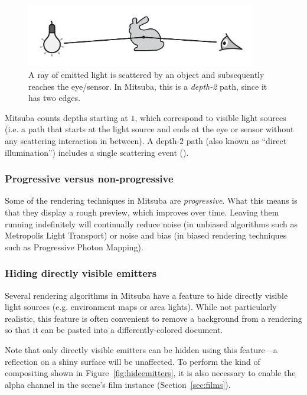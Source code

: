 \begin{figure}[h!]
\centering
\vspace{-5mm}
\includegraphics[width=10cm]{images/path_explanation.pdf}
\vspace{-5mm}
\caption{
    \label{fig:path-explanation}
    A ray of emitted light is scattered by an object and subsequently
    reaches the eye/sensor.
    In Mitsuba, this is a \emph{depth-2} path, since it has two edges.
}
\end{figure}
Mitsuba counts depths starting at $1$, which correspond to
visible light sources (i.e. a path that starts at the light
source and ends at the eye or sensor without any scattering
interaction in between).
A depth-$2$ path (also known as ``direct illumination'') includes
a single scattering event ().

\subsubsection*{Progressive versus non-progressive}
Some of the rendering techniques in Mitsuba are \emph{progressive}.
What this means is that they display a rough preview, which improves over time.
Leaving them running indefinitely will continually reduce noise (in unbiased algorithms
such as Metropolis Light Transport) or noise and bias (in biased
rendering techniques such as Progressive Photon Mapping).
\newpage
\subsubsection*{Hiding directly visible emitters}
\label{sec:hideemitters}
Several rendering algorithms in Mitsuba have a feature to hide directly
visible light sources (e.g. environment maps or area lights). While not
particularly realistic, this feature is often convenient to remove a background
from a rendering so that it can be pasted into a differently-colored document.

Note that only directly visible emitters can be hidden using this feature---a
reflection on a shiny surface will be unaffected. To perform the kind of
compositing shown in Figure~\ref{fig:hideemitters}, it is also necessary to
enable the alpha channel in the scene's film instance (Section~\ref{sec:films}).

